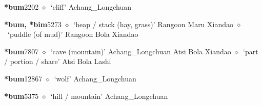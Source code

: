   \begin{list}{}{\leftmargin=1.5em \itemindent=-1.5em}
  \item {\footnotesize \textbf{*bum}}{\tiny 2202}
         $\diamond$~`cliff'
         Achang\_Longchuan 
  \item {\footnotesize \textbf{*bum, *bim}}{\tiny 5273}
\hspace{1ex}
         $\diamond$~`heap / stack (hay, grass)'
         Rangoon 
\hspace{1ex}
         Maru 
\hspace{1ex}
         Xiandao 
\hspace{1ex}
         $\diamond$~`puddle (of mud)'
         Rangoon 
\hspace{1ex}
         Bola 
\hspace{1ex}
         Xiandao 
  \item {\footnotesize \textbf{*bum}}{\tiny 7807}
\hspace{1ex}
         $\diamond$~`cave (mountain)'
         Achang\_Longchuan 
\hspace{1ex}
         Atsi 
\hspace{1ex}
         Bola 
\hspace{1ex}
         Xiandao 
\hspace{1ex}
         $\diamond$~`part / portion / share'
         Atsi 
\hspace{1ex}
         Bola 
\hspace{1ex}
         Lashi 
  \item {\footnotesize \textbf{*bum}}{\tiny 12867}
\hspace{1ex}
         $\diamond$~`wolf'
         Achang\_Longchuan 
  \item {\footnotesize \textbf{*bum}}{\tiny 5375}
\hspace{1ex}
         $\diamond$~`hill / mountain'
         Achang\_Longchuan 
\hspace{1ex}

\end{list}
